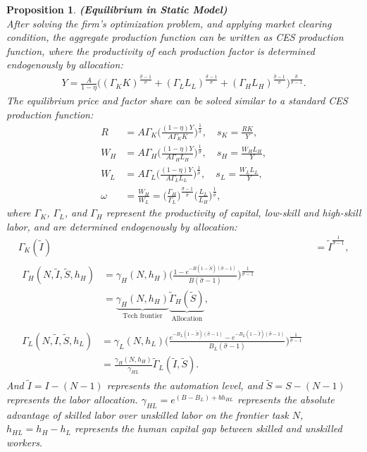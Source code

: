 \documentclass[12pt]{article}
\newtheorem{proposition}{Proposition}
\begin{document}
\begin{proposition}{\bf (Equilibrium in Static Model)} \\

After solving the firm's optimization problem, and applying market clearing condition, the aggregate production function can be written as CES production function, where the productivity of each production factor is determined endogenously by allocation: 
\begin{align}
\label{output}
Y = \frac{A}{1-\eta}\Big((\Gamma_KK)^{\frac{\hat{\sigma}-1}{\hat{\sigma}}}+(\Gamma_LL_L)^{\frac{\hat{\sigma}-1}{\hat{\sigma}}}+(\Gamma_HL_H)^{\frac{\hat{\sigma}-1}{\hat{\sigma}}}\Big)^{\frac{\hat{\sigma}}{\hat{\sigma}-1}}.
\end{align}
The equilibrium price and factor share can be solved similar to a standard CES production function: 
\begin{align*}
R &=A\Gamma_K\Big(\frac{(1-\eta)Y}{A\Gamma_KK}\Big)^{\frac{1}{\hat{\sigma}}},   \quad s_K= \frac{RK}{Y},  \\
W_H &=A\Gamma_H\Big(\frac{(1-\eta)Y}{A\Gamma_HL_H}\Big)^{\frac{1}{\hat{\sigma}}},  \quad s_H = \frac{W_HL_H}{Y},  \\
W_L &= A\Gamma_L\Big(\frac{(1-\eta)Y}{A\Gamma_LL_L}\Big)^{\frac{1}{\hat{\sigma}}},  \quad s_L = \frac{W_LL_L}{Y},   \\
\omega &= \frac{W_H}{W_L} = \Big(\frac{\Gamma_H}{\Gamma_L} \Big)^{\frac{\hat{\sigma}-1}{\hat{\sigma}}}\Big(\frac{L_L}{L_H} \Big)^{\frac{1}{\hat{\sigma}}}, 
\end{align*}
where $\Gamma_K$, $\Gamma_L$, and $\Gamma_H$ represent the productivity of capital, low-skill and high-skill labor, and are determined endogenously by allocation: 
\begin{align}
\label{Gamma_K}
\Gamma_K(\tilde{I}) &= \tilde{I}^{\frac{1}{\hat{\sigma}-1}}, \\
\label{Gamma_H}
\begin{split}
\Gamma_H(N,\tilde{I},\tilde{S},h_H)  &= \gamma_H(N,h_H)\Big(\frac{1-e^{-B(1-\tilde{S})(\hat{\sigma}-1)}}{B(\hat{\sigma}-1)}\Big)^{\frac{1}{\hat{\sigma}-1}} \\
&= \underbrace{\gamma_H(N,h_H)}_{\text{Tech frontier}}\underbrace{\tilde{\Gamma}_H(\tilde{S})}_{\text{Allocation}},
\end{split}
\\
\label{Gamma_L}
\begin{split}
\Gamma_L(N,\tilde{I},\tilde{S},h_L)  &= \gamma_L(N,h_L)\Big(\frac{e^{-B_L(1-\tilde{S})(\hat{\sigma}-1)}-e^{-B_L(1-\tilde{I})(\hat{\sigma}-1)}}{B_L(\hat{\sigma}-1)}\Big)^{\frac{1}{\hat{\sigma}-1}}\\
 &=\frac{\gamma_H(N,h_H)}{\gamma_{HL}}\tilde{\Gamma}_L(\tilde{I},\tilde{S}).
 \end{split}
\end{align}
And $\tilde{I} = I-(N-1)$ represents the automation level, and $\tilde{S} = S-(N-1)$ represents the labor allocation. $\gamma_{HL} = e^{(B-B_L)+bh_{HL}}$ represents the absolute advantage of skilled labor over unskilled labor on the frontier task $N$, $h_{HL} = h_H-h_L$ represents the human capital gap between skilled and unskilled workers.  
\end{proposition}
\end{document}
